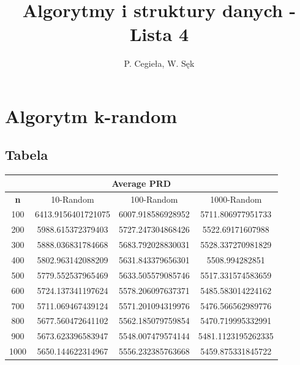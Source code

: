 \documentclass{article}
\title{Algorytmy i struktury danych - Lista 4}
\author{P. Cegieła, W. Sęk}
\begin{document}
 

\maketitle
\section{Algorytm k-random}
\subsection{Tabela}
\begin{center}
\begin{tabular}{|c|c|c|c|}
\hline
\multicolumn{4}{|c|}{\textbf{Average PRD}}\\
\hline
\textbf{n} & 10-Random & 100-Random & 1000-Random\\
\hline
100 & 6413.9156401721075 & 6007.918586928952 & 5711.806977951733\\
\hline
200 & 5988.615372379403 & 5727.247304868426 & 5522.69171607988\\
\hline
300 & 5888.036831784668 & 5683.792028830031 & 5528.337270981829\\
\hline
400 & 5802.963142088209 & 5631.843379656301 & 5508.994282851\\
\hline
500 & 5779.552537965469 & 5633.505579085746 & 5517.331574583659\\
\hline
600 & 5724.137341197624 & 5578.206097637371 & 5485.583014224162\\
\hline
700 & 5711.069467439124 & 5571.201094319976 & 5476.566562989776\\
\hline
800 & 5677.560472641102 & 5562.185079759854 & 5470.719995332991\\
\hline
900 & 5673.623396583947 & 5548.007479574144 & 5481.1123195262335\\
\hline
1000 & 5650.144622314967 & 5556.232385763668 & 5459.875331845722\\
\hline
\end{tabular}
\end{center}
\end{document}
